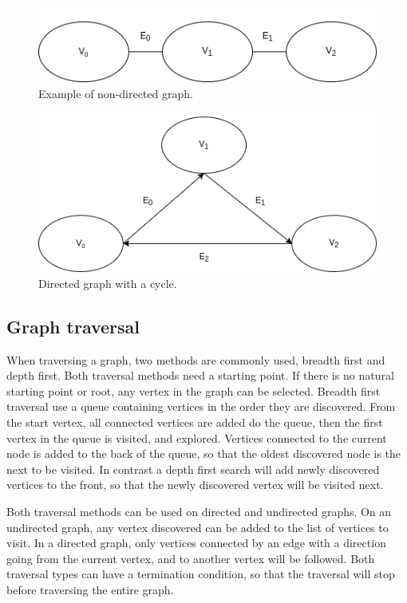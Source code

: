 \begin{figure}[h]
    \centering
    \includegraphics[scale=0.5]{figs/simpleAG.png}
    \caption{Example of non-directed graph.}
    \label{fig:DAGvsAG}
\end{figure}

\begin{figure}[h]
    \centering
    \includegraphics[scale=0.5]{figs/triangleDG.png}
    \caption{Directed graph with a cycle.}
    \label{fig:DAGvsDG}
\end{figure}

\subsection{Graph traversal}
When traversing a graph, two methods are commonly used, breadth first and depth first. Both traversal methods need a starting point. If there is no natural starting point or root, any vertex in the graph can be selected. Breadth first traversal use a queue containing vertices in the order they are discovered. From the start vertex, all connected vertices are added do the queue, then the first vertex in the queue is visited, and explored. Vertices connected to the current node is added to the back of the queue, so that the oldest discovered node is the next to be visited. In contrast a depth first search will add newly discovered vertices to the front, so that the newly discovered vertex will be visited next.

Both traversal methods can be used on directed and undirected graphs. On an undirected graph, any vertex discovered can be added to the list of vertices to visit. In a directed graph, only vertices connected by an edge with a direction going from the current vertex, and to another vertex will be followed. Both traversal types can have a termination condition, so that the traversal will stop before traversing the entire graph.


